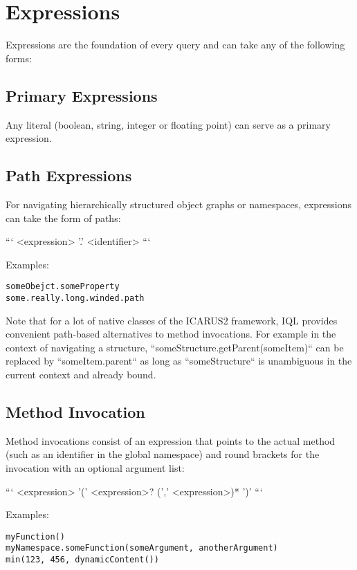 \documentclass[11pt]{article}
\begin{document}
\section{Expressions}
\label{sec:expressions}

Expressions are the foundation of every query and can take any of the following forms:

\subsection{Primary Expressions}
\label{sec:primary-expressions}

Any literal (boolean, string, integer or floating point) can serve as a primary expression.

\subsection{Path Expressions}
\label{sec:path-expressions}

For navigating hierarchically structured object graphs or namespaces, expressions can take the form of paths:

```
<expression> '.' <identifier>
```

Examples:

\begin{verbatim}
someObejct.someProperty
some.really.long.winded.path
\end{verbatim}

Note that for a lot of native classes of the ICARUS2 framework, IQL provides convenient path-based alternatives to method invocations. For example in  the context of navigating a structure, ``someStructure.getParent(someItem)`` can be replaced by ``someItem.parent`` as long as ``someStructure`` is unambiguous in the current context and already bound.

\subsection{Method Invocation}
\label{sec:method-invocations}

Method invocations consist of an expression that points to the actual method (such as an identifier in the global namespace) and round brackets for the invocation with an optional argument list:

```
<expression> '(' <expression>? (',' <expression>)* ')'
```

Examples:

\begin{verbatim}
myFunction()
myNamespace.someFunction(someArgument, anotherArgument)
min(123, 456, dynamicContent())
\end{verbatim}
\end{document}
